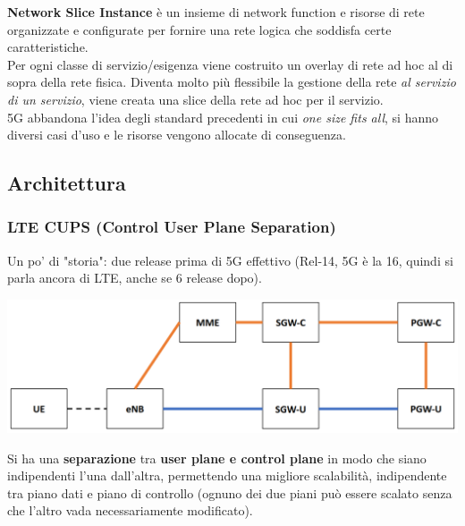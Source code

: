 \textbf{Network Slice Instance} è un insieme di network function e risorse di rete organizzate e configurate per fornire una rete logica che soddisfa certe caratteristiche.\\

Per ogni classe di servizio/esigenza viene costruito un overlay di rete ad hoc al di sopra della rete fisica. Diventa molto più flessibile la gestione della rete \textit{al servizio di un servizio}, viene creata una slice della rete ad hoc per il servizio.\\

5G abbandona l'idea degli standard precedenti in cui \textit{one size fits all}, si hanno diversi casi d'uso e le risorse vengono allocate di conseguenza. \\


\newpage

\subsection{Architettura}

\subsubsection{LTE CUPS (Control User Plane Separation)}

Un po' di "storia": due release prima di 5G effettivo (Rel-14, 5G è la 16, quindi si parla ancora di LTE, anche se 6 release dopo). 
\begin{center}
	\includegraphics[width=0.7\linewidth]{img/5g/ltecups}
\end{center}
Si ha una \textbf{separazione} tra \textbf{user plane e control plane} in modo che siano indipendenti l'una dall'altra, permettendo una migliore scalabilità, indipendente tra piano dati e piano di controllo (ognuno dei due piani può essere scalato senza che l'altro vada necessariamente modificato). \\

